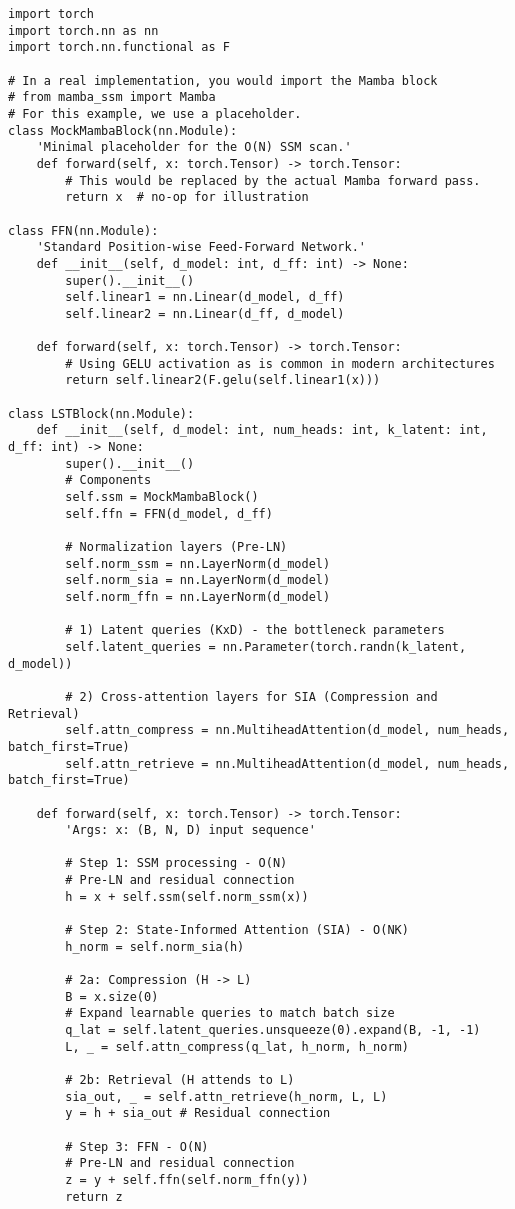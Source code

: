 \documentclass[10pt,twocolumn,letterpaper]{article}
\begin{document}
\begin{lstlisting}[style=pytorchstyle, caption={PyTorch-style pseudocode for the LST Block.}, label=lst:code_block]
import torch
import torch.nn as nn
import torch.nn.functional as F

# In a real implementation, you would import the Mamba block
# from mamba_ssm import Mamba
# For this example, we use a placeholder.
class MockMambaBlock(nn.Module):
    'Minimal placeholder for the O(N) SSM scan.'
    def forward(self, x: torch.Tensor) -> torch.Tensor:
        # This would be replaced by the actual Mamba forward pass.
        return x  # no-op for illustration

class FFN(nn.Module):
    'Standard Position-wise Feed-Forward Network.'
    def __init__(self, d_model: int, d_ff: int) -> None:
        super().__init__()
        self.linear1 = nn.Linear(d_model, d_ff)
        self.linear2 = nn.Linear(d_ff, d_model)

    def forward(self, x: torch.Tensor) -> torch.Tensor:
        # Using GELU activation as is common in modern architectures
        return self.linear2(F.gelu(self.linear1(x)))

class LSTBlock(nn.Module):
    def __init__(self, d_model: int, num_heads: int, k_latent: int, d_ff: int) -> None:
        super().__init__()
        # Components
        self.ssm = MockMambaBlock()
        self.ffn = FFN(d_model, d_ff)

        # Normalization layers (Pre-LN)
        self.norm_ssm = nn.LayerNorm(d_model)
        self.norm_sia = nn.LayerNorm(d_model)
        self.norm_ffn = nn.LayerNorm(d_model)

        # 1) Latent queries (KxD) - the bottleneck parameters
        self.latent_queries = nn.Parameter(torch.randn(k_latent, d_model))

        # 2) Cross-attention layers for SIA (Compression and Retrieval)
        self.attn_compress = nn.MultiheadAttention(d_model, num_heads, batch_first=True)
        self.attn_retrieve = nn.MultiheadAttention(d_model, num_heads, batch_first=True)

    def forward(self, x: torch.Tensor) -> torch.Tensor:
        'Args: x: (B, N, D) input sequence'

        # Step 1: SSM processing - O(N)
        # Pre-LN and residual connection
        h = x + self.ssm(self.norm_ssm(x))

        # Step 2: State-Informed Attention (SIA) - O(NK)
        h_norm = self.norm_sia(h)

        # 2a: Compression (H -> L)
        B = x.size(0)
        # Expand learnable queries to match batch size
        q_lat = self.latent_queries.unsqueeze(0).expand(B, -1, -1)
        L, _ = self.attn_compress(q_lat, h_norm, h_norm)

        # 2b: Retrieval (H attends to L)
        sia_out, _ = self.attn_retrieve(h_norm, L, L)
        y = h + sia_out # Residual connection

        # Step 3: FFN - O(N)
        # Pre-LN and residual connection
        z = y + self.ffn(self.norm_ffn(y))
        return z
\end{lstlisting}
\end{document}
